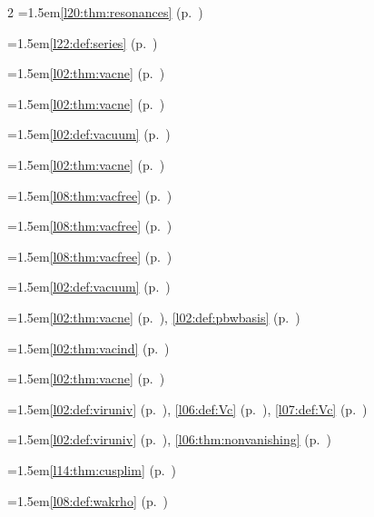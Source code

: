 \begin{multicols}{2}
\hangindent=1.5em\quad \ref{l20:thm:resonances} (p.~\pageref{l20:thm:resonances})\par
\hangindent=1.5em\quad \ref{l22:def:series} (p.~\pageref{l22:def:series})\par
\hangindent=1.5em\quad \ref{l02:thm:vacne} (p.~\pageref{l02:thm:vacne})\par
\hangindent=1.5em\quad \ref{l02:thm:vacne} (p.~\pageref{l02:thm:vacne})\par
\hangindent=1.5em\quad \ref{l02:def:vacuum} (p.~\pageref{l02:def:vacuum})\par
\hangindent=1.5em\quad \ref{l02:thm:vacne} (p.~\pageref{l02:thm:vacne})\par
\hangindent=1.5em\quad \ref{l08:thm:vacfree} (p.~\pageref{l08:thm:vacfree})\par
\hangindent=1.5em\quad \ref{l08:thm:vacfree} (p.~\pageref{l08:thm:vacfree})\par
\hangindent=1.5em\quad \ref{l08:thm:vacfree} (p.~\pageref{l08:thm:vacfree})\par
\hangindent=1.5em\quad \ref{l02:def:vacuum} (p.~\pageref{l02:def:vacuum})\par
\hangindent=1.5em\quad \ref{l02:thm:vacne} (p.~\pageref{l02:thm:vacne}), \ref{l02:def:pbwbasis} (p.~\pageref{l02:def:pbwbasis})\par
\hangindent=1.5em\quad \ref{l02:thm:vacind} (p.~\pageref{l02:thm:vacind})\par
\hangindent=1.5em\quad \ref{l02:thm:vacne} (p.~\pageref{l02:thm:vacne})\par
\hangindent=1.5em\quad \ref{l02:def:viruniv} (p.~\pageref{l02:def:viruniv}), \ref{l06:def:Vc} (p.~\pageref{l06:def:Vc}), \ref{l07:def:Vc} (p.~\pageref{l07:def:Vc})\par
\hangindent=1.5em\quad \ref{l02:def:viruniv} (p.~\pageref{l02:def:viruniv}), \ref{l06:thm:nonvanishing} (p.~\pageref{l06:thm:nonvanishing})\par
\hangindent=1.5em\quad \ref{l14:thm:cusplim} (p.~\pageref{l14:thm:cusplim})\par
\hangindent=1.5em\quad \ref{l08:def:wakrho} (p.~\pageref{l08:def:wakrho})\par

\end{multicols}

